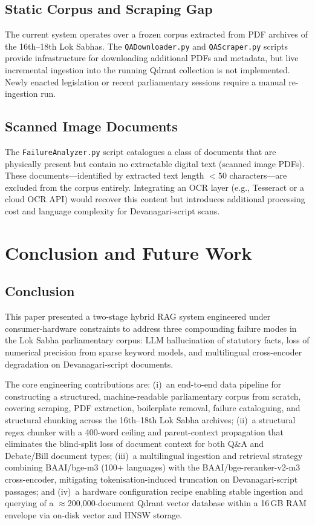 \documentclass[conference]{IEEEtran}
\begin{document}
\subsection{Static Corpus and Scraping Gap}

The current system operates over a frozen corpus extracted from PDF
archives of the 16th--18th Lok Sabhas.
The \texttt{QADownloader.py} and \texttt{QAScraper.py} scripts provide
infrastructure for downloading additional PDFs and metadata, but live
incremental ingestion into the running Qdrant collection is not implemented.
Newly enacted legislation or recent parliamentary sessions require a manual
re-ingestion run.

\subsection{Scanned Image Documents}

The \texttt{FailureAnalyzer.py} script catalogues a class of documents that
are physically present but contain no extractable digital text (scanned image
PDFs).
These documents---identified by extracted text length $<50$ characters---are
excluded from the corpus entirely.
Integrating an OCR layer (e.g., Tesseract or a cloud OCR API) would recover
this content but introduces additional processing cost and language complexity
for Devanagari-script scans.

\section{Conclusion and Future Work}
\label{sec:conclusion}

\subsection{Conclusion}

This paper presented a two-stage hybrid RAG system engineered under consumer-hardware
constraints to address three compounding failure modes in the Lok Sabha parliamentary
corpus: LLM hallucination of statutory facts, loss of numerical precision from
sparse keyword models, and multilingual cross-encoder degradation on Devanagari-script documents.

The core engineering contributions are:
(i)~an end-to-end data pipeline for constructing a structured, machine-readable
parliamentary corpus from scratch, covering scraping, PDF extraction, boilerplate
removal, failure cataloguing, and structural chunking across the 16th--18th
Lok Sabha archives;
(ii)~a structural regex chunker with a 400-word ceiling and parent-context
propagation that eliminates the blind-split loss of document context for both
Q\&A and Debate/Bill document types;
(iii)~a multilingual ingestion and retrieval strategy combining BAAI/bge-m3
(100+ languages) with the BAAI/bge-reranker-v2-m3 cross-encoder, mitigating
tokenisation-induced truncation on Devanagari-script passages; and
(iv)~a hardware configuration recipe enabling stable ingestion and querying of
a $\approx$200,000-document Qdrant vector database within a 16\,GB RAM envelope
via on-disk vector and HNSW storage.
\end{document}
